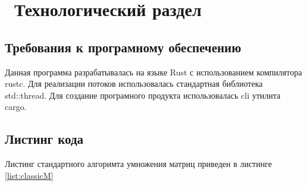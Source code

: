 \chapter{ Технологический раздел}
\section{ Требования к програмному обеспечению}
Данная программа разрабатывалась на языке Rust с использованием компилятора rustc. Для реализации потоков использовалась стандартная библиотека std::thread. Для создание програмного продукта использовалась cli утилита cargo.

\section{ Листинг кода}

Листинг стандартного алгоримта умножения матриц приведен в листинге \ref{list:classicM}

